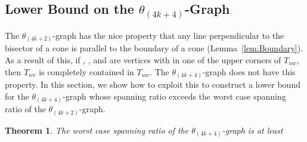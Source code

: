 \documentclass[12pt]{article}
\newtheorem{theo}[defin]{Theorem}
\newenvironment{theorem}{\begin{theo} \sl}{\end{theo}}
\newcommand{\Graph}[1]{\ensuremath{\theta_{(4 k + #1)}}-Graph\xspace}
\newcommand{\graph}[1]{\ensuremath{\theta_{(4 k + #1)}}-graph\xspace}
\newcommand{\canon}[2]{\ensuremath{T_{#1 #2}}}
\begin{document}
\subsection{Lower Bound on the \Graph{4}}
The \graph{2} has the nice property that any line perpendicular to the bisector of a cone is parallel to the boundary of a cone (Lemma~\ref{lem:Boundary}). As a result of this, if , , and  are vertices with  in one of the upper corners of \canon{u}{w}, then \canon{w}{v} is completely contained in \canon{u}{w}. The \graph{4} does not have this property. In this section, we show how to exploit this to construct a lower bound for the \graph{4} whose spanning ratio exceeds the worst case spanning ratio of the \graph{2}. 

\begin{theorem}
  The worst case spanning ratio of the \graph{4} is at least  
\end{theorem}
\end{document}
